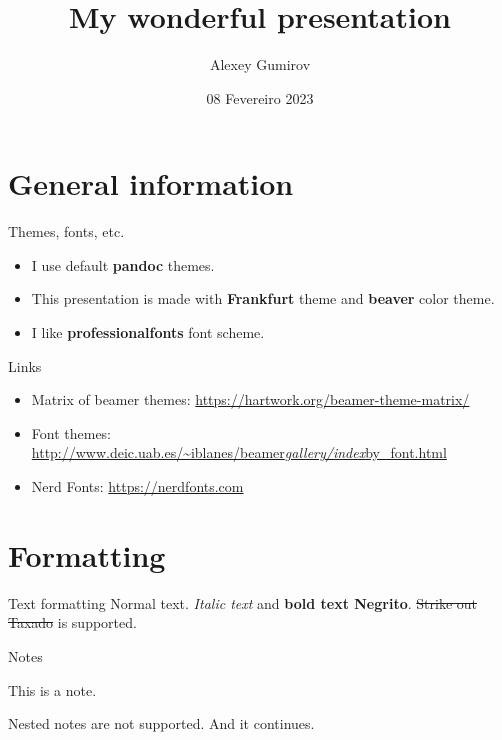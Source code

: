 \documentclass[
  11pt,
  ignorenonframetext,
  aspectratio=169,
  aspectratio=169]{beamer}
\title{My wonderful presentation}
\author{Alexey Gumirov}
\date{08 Fevereiro 2023}
\institute{My home office}
\providecommand{\tightlist}{%
  \setlength{\itemsep}{0pt}\setlength{\parskip}{0pt}}
\renewenvironment{quote}{\begin{customblockquote}\list{}{\rightmargin=0em\leftmargin=0em}%
\item\relax\color{blockquote-text}\ignorespaces}{\unskip\unskip\endlist\end{customblockquote}}
\begin{document}
\frame{\titlepage}

\begin{frame}
  \tableofcontents[hideallsubsections]
\end{frame}
\hypertarget{general-information}{%
\section{General information}\label{general-information}}

\begin{frame}{Themes, fonts, etc.}
\protect\hypertarget{themes-fonts-etc.}{}
\begin{itemize}
\tightlist
\item
  I use default \textbf{pandoc} themes.
\item
  This presentation is made with \textbf{Frankfurt} theme and
  \textbf{beaver} color theme.
\item
  I like \textbf{professionalfonts} font scheme.
\end{itemize}
\end{frame}

\begin{frame}{Links}
\protect\hypertarget{links}{}
\begin{itemize}
\tightlist
\item
  Matrix of beamer themes:
  \url{https://hartwork.org/beamer-theme-matrix/}
\item
  Font themes:
  \href{http://www.deic.uab.es/~iblanes/beamer_gallery/index_by_font.html}{http://www.deic.uab.es/\textasciitilde iblanes/beamer\emph{gallery/index}by\_font.html}
\item
  Nerd Fonts: \url{https://nerdfonts.com}
\end{itemize}
\end{frame}

\hypertarget{formatting}{%
\section{Formatting}\label{formatting}}

\begin{frame}{Text formatting}
\protect\hypertarget{text-formatting}{}
Normal text. \emph{Italic text} and \textbf{bold text Negrito}.
\st{Strike out Taxado} is supported.
\end{frame}

\begin{frame}{Notes}
\protect\hypertarget{notes}{}
\begin{quote}
This is a note.

\begin{quote}
Nested notes are not supported. And it continues.
\end{quote}
\end{quote}
\end{frame}
\end{document}
